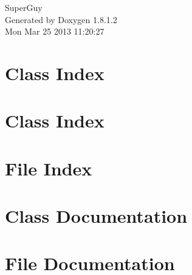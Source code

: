 \documentclass{book}
\begin{document}
\hypersetup{pageanchor=false,citecolor=blue}
\begin{titlepage}
\vspace*{7cm}
\begin{center}
{\Large Super\-Guy }\\
\vspace*{1cm}
{\large Generated by Doxygen 1.8.1.2}\\
\vspace*{0.5cm}
{\small Mon Mar 25 2013 11:20:27}\\
\end{center}
\end{titlepage}
\clearemptydoublepage
{}
\tableofcontents
\clearemptydoublepage
{}
\hypersetup{pageanchor=true,citecolor=blue}
\chapter{Class Index}

\chapter{Class Index}

\chapter{File Index}

\chapter{Class Documentation}














\chapter{File Documentation}





















\printindex
\end{document}

